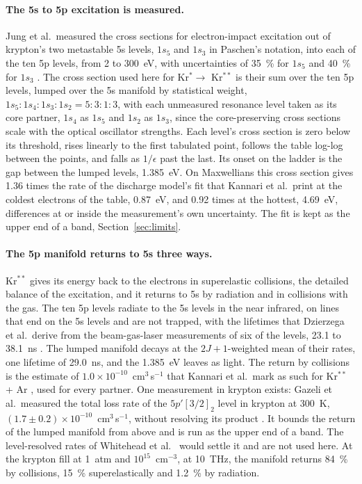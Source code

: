 \documentclass[11pt]{article}
\begin{document}
\paragraph{The 5s to 5p excitation is measured.}
Jung et al.\ measured the cross sections for electron-impact excitation out of krypton's two metastable 5s
levels, $1s_5$ and $1s_3$ in Paschen's notation, into each of the ten 5p levels, from 2 to 300~eV, with
uncertainties of 35~\% for $1s_5$ and 40~\% for $1s_3$ \cite{Jung2005,Jung2006}. The cross section used here for
Kr$^*\to$ Kr$^{**}$ is their sum over the ten 5p levels, lumped over the 5s manifold by statistical weight,
$1s_5:1s_4:1s_3:1s_2=5:3:1:3$, with each unmeasured resonance level taken as its core partner, $1s_4$ as $1s_5$
and $1s_2$ as $1s_3$, since the core-preserving cross sections scale with the optical oscillator strengths. Each
level's cross section is zero below its threshold, rises linearly to the first tabulated point, follows the table
log-log between the points, and falls as $1/\epsilon$ past the last. Its onset on the ladder is the gap
between the lumped levels, 1.385~eV. On Maxwellians this cross section gives 1.36 times the rate of the discharge
model's fit that Kannari et al.\ print \cite{Kannari1985,JacobMangano1976} at the coldest electrons of the table,
0.87~eV, and 0.92 times at the hottest, 4.69~eV, differences at or inside the measurement's own uncertainty. The
fit is kept as the upper end of a band, Section~\ref{sec:limits}.

\paragraph{The 5p manifold returns to 5s three ways.}
Kr$^{**}$ gives its energy back to the electrons in superelastic collisions, the detailed balance of the
excitation, and it returns to 5s by radiation and in collisions with the gas. The ten 5p levels radiate to the 5s
levels in the near infrared, on lines that end on the 5s levels and are not trapped, with the lifetimes that
Dzierzega et al.\ derive from the beam-gas-laser measurements of six of the levels, 23.1 to 38.1~ns
\cite{Dzierzega2000}. The lumped manifold decays at the $2J+1$-weighted mean of their rates, one lifetime of
29.0~ns, and the 1.385~eV leaves as light. The return by collisions is the estimate of
$1.0\times10^{-10}$~cm$^3$\,s$^{-1}$ that Kannari et al.\ mark as such for Kr$^{**}$ + Ar \cite{Kannari1985},
used for every partner. One measurement in krypton exists: Gazeli et al.\ measured the total loss rate of the
$5p'[3/2]_2$ level in krypton at 300~K, $(1.7\pm0.2)\times10^{-10}$~cm$^3$\,s$^{-1}$, without resolving its
product \cite{Gazeli2021}. It bounds the return of the lumped manifold from above and is run as the upper end of
a band. The level-resolved rates of Whitehead et al.\ \cite{Whitehead1995} would settle it and are not used
here. At the krypton fill at 1~atm and $10^{15}$~cm$^{-3}$, at 10~THz, the manifold returns 84~\% by collisions,
15~\% superelastically and 1.2~\% by radiation.
\end{document}
